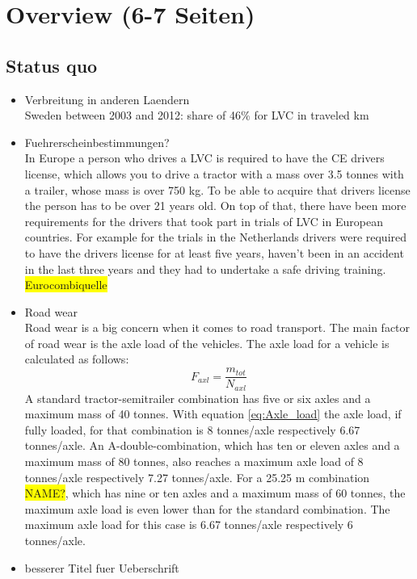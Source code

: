 \documentclass[ExampleMasters.tex]{subfiles}
\begin{document}
\clearpage
\chapter{Overview (6-7 Seiten)}
\label{chap:overview}


\section{Status quo}
\label{sec:legal_situation}

\begin{itemize}
	\item Verbreitung in anderen Laendern \\
	Sweden between 2003 and 2012: share of 46\% for LVC in traveled km \cite{balint2013correlation} 	
	\item Fuehrerscheinbestimmungen? \\
	In Europe a person who drives a LVC is required to have the CE drivers license, which allows you to drive a tractor with a  mass over 3.5 tonnes with a trailer, whose mass is over 750 kg. To be able to acquire that drivers license the person has to be over 21 years old. \cite{EU_driving_licenses} 
	On top of that, there have been more requirements for the drivers that took part in trials of LVC in European countries. For example for the trials in the Netherlands drivers were required to have the drivers license for at least five years, haven't been in an accident in the last three years and they had to undertake a safe driving training. \colorbox{yellow}{Eurocombiquelle}     
	\item Road wear\\
	Road wear is a big concern when it comes to road transport. The main factor of road wear is the axle load of the vehicles.
	The axle load for a vehicle is calculated as follows:\\
	\begin{equation}
	F_{axl}=\frac{m_{tot}}{N_{axl}}
	\label{eq:Axle_load}
	\end{equation}
	A standard tractor-semitrailer combination has five or six axles and a maximum mass of 40 tonnes.
	With equation \eqref{eq:Axle_load} the axle load, if fully loaded, for that combination is 8 tonnes/axle respectively 6.67 tonnes/axle.
	An A-double-combination, which has ten or eleven axles and a maximum mass of 80 tonnes, also reaches a maximum axle  load of 8 tonnes/axle respectively 7.27 tonnes/axle.
	For a 25.25 m combination \colorbox{yellow}{NAME?}, which has nine or ten axles and a maximum mass of 60 tonnes, the maximum axle load is even lower than for the standard combination. The maximum axle load for this case is 6.67 tonnes/axle respectively 6 tonnes/axle. 
	\item besserer Titel fuer Ueberschrift
\end{itemize}
\end{document}
